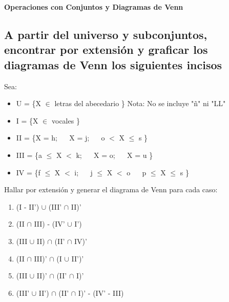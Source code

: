 \documentclass{article}%
\begin{document}
\begin{Large}
\begin{center}
\textbf{Operaciones con Conjuntos y Diagramas de Venn} \\
\end{center}
\end{Large}

\vspace{0.2in}

\begin{small}
    \section*{A partir del universo y subconjuntos, encontrar por extensión y graficar los diagramas de Venn los siguientes incisos} \textit{}
\end{small}

\vspace{0.2in}

Sea: 

\begin{itemize}
    \item U = \{X $\in$ letras del abecedario \} \hspace{0.20in} Nota: No se incluye "ñ" ni "LL"
    \item I = \{X $\in$ vocales \}
    \item II = \{X = h; $\quad$ X = j; $\quad$ o $<$ X $\leq$ s  \}
    \item III = \{a $\leq$ X $<$ k; $\quad$  X = o; $\quad$ X = u  \}
     \item IV = \{f $\leq$ X $<$ i; $\quad$ j $\leq$ X $<$ o $\quad$  p $\leq$ X $\leq$ s \}
\end{itemize}

\vspace{0.10in}

Hallar por extensión y generar el diagrama de Venn para cada caso:

\begin{enumerate}[label=\alph*)]
    \item (I - II') $\cup$ (III' $\cap$ II)'     \label{a}
    \item (II $\cap$ III) - (IV' $\cup$ I')         \label{b}
    \item (III $\cup$ II) $\cap$ (II' $\cap$ IV)'   \label{c}
    \item (II $\cap$ III)' $\cap$ (I $\cup$ II')'   \label{d}
    \item (III $\cup$ II)' $\cap$ (II' $\cap$ I)'    \label{e}
    \item (III' $\cup$ II') $\cap$ (II' $\cap$ I)' - (IV' - III)   \label{f}
\end{enumerate}
\end{document}
